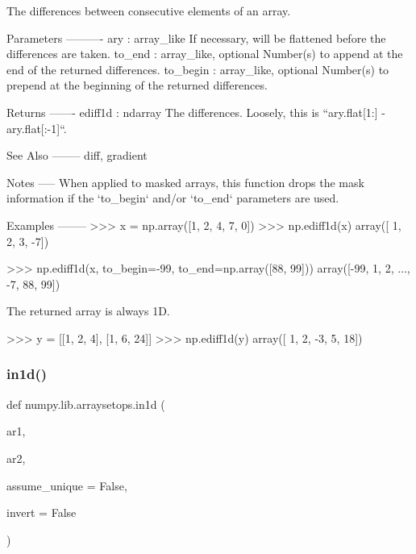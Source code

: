 \begin{DoxyVerb}The differences between consecutive elements of an array.

Parameters
----------
ary : array_like
    If necessary, will be flattened before the differences are taken.
to_end : array_like, optional
    Number(s) to append at the end of the returned differences.
to_begin : array_like, optional
    Number(s) to prepend at the beginning of the returned differences.

Returns
-------
ediff1d : ndarray
    The differences. Loosely, this is ``ary.flat[1:] - ary.flat[:-1]``.

See Also
--------
diff, gradient

Notes
-----
When applied to masked arrays, this function drops the mask information
if the `to_begin` and/or `to_end` parameters are used.

Examples
--------
>>> x = np.array([1, 2, 4, 7, 0])
>>> np.ediff1d(x)
array([ 1,  2,  3, -7])

>>> np.ediff1d(x, to_begin=-99, to_end=np.array([88, 99]))
array([-99,   1,   2, ...,  -7,  88,  99])

The returned array is always 1D.

>>> y = [[1, 2, 4], [1, 6, 24]]
>>> np.ediff1d(y)
array([ 1,  2, -3,  5, 18])\end{DoxyVerb}
 \mbox{\label{namespacenumpy_1_1lib_1_1arraysetops_a23feca2c05fb2ccf7d9e1d0db8b1f079}} 
\subsubsection{\texorpdfstring{in1d()}{in1d()}}
{\footnotesize\ttfamily def numpy.\+lib.\+arraysetops.\+in1d (\begin{DoxyParamCaption}\item[{}]{ar1,  }\item[{}]{ar2,  }\item[{}]{assume\+\_\+unique = {\ttfamily False},  }\item[{}]{invert = {\ttfamily False} }\end{DoxyParamCaption})}

